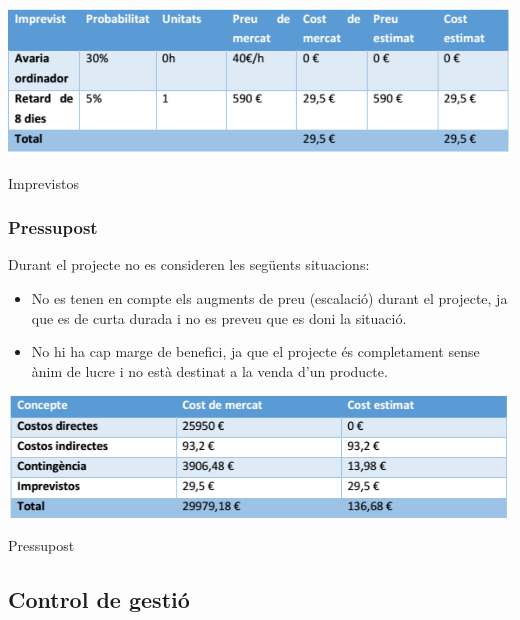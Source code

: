 \documentclass[11pt,catalan,listoffigures,listoftables]{tfgetsinf}
\begin{document}
\begin{table}[H]
\centering
\includegraphics[width=15cm]{images/taula5}
\caption[Taula 7.4]{Imprevistos}
\centering
\end{table}

\subsubsection{Pressupost}

Durant el projecte no es consideren les següents situacions:
\begin{itemize}
	\item No es tenen en compte els augments de preu (escalació) durant el projecte, ja que es de curta durada i no es preveu que es doni la situació.
	\item No hi ha cap marge de benefici, ja que el projecte és completament sense ànim de lucre i no està destinat a la venda d’un producte.
\end{itemize}

\begin{table}[H]
\centering
\includegraphics[width=15cm]{images/taula6}
\caption[Taula 7.5]{Pressupost}
\centering
\end{table}

\subsection{Control de gestió}
\end{document}
